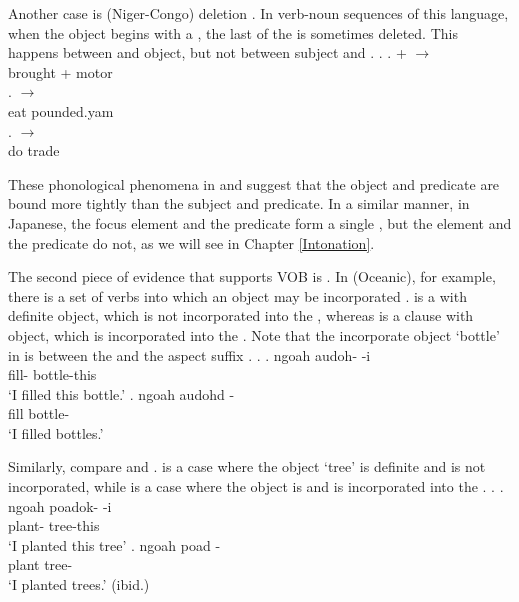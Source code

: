 Another case is  (Niger-Congo)  deletion \cite[from][]{bamgbose64}.
In verb-noun sequences of this language,
when the object begins with a ,
the last  of the  is sometimes deleted.
This happens between  and object, but not between subject and .
%
\ex.
 \ag.  +  $\to$  \\
		brought + motor \\
 \bg.   $\to$  \\
 		eat pounded.yam \\
 \bg.   $\to$  \\
 		do trade \\
		\hfill{\cite[][pp.~29--30]{bamgbose64}}

These phonological phenomena in  and  suggest that
the object and predicate are bound more tightly than the subject and predicate.
In a similar manner,
in Japanese,
the focus element and the predicate form a single ,
but the  element and the predicate do not,
as we will see in Chapter \ref{Intonation}.

The second piece of evidence that supports VOB is .
In  (Oceanic), for example,
there is a set of verbs into which an  object may be incorporated \cite[from][]{harrison76}.
\Next[a] is a  with definite object,
which is not incorporated into the ,
whereas \Next[b] is a clause with  object,
which is incorporated into the .
Note that the incorporate object  `bottle' in \Next[b] is between the  and the aspect suffix .
%
\ex.
 \ag. ngoah audoh- -i \\
		 fill- bottle-this \\
		`I filled this bottle.'
 \bg. ngoah audohd - \\
		 fill bottle- \\
		`I filled bottles.'
		\hfill{\cite[162]{harrison76}}

Similarly,
compare \Next[a] and \Next[b].
\Next[a] is a case where the object  `tree' is definite and is not incorporated,
while \Next[b] is a case where the object is  and is incorporated into the .
\ex.
 \ag. ngoah poadok- -i \\
 	 plant- tree-this \\
	`I planted this tree'
 \bg. ngoah poad - \\
 	 plant tree- \\
	`I planted trees.'
	\hfill{(ibid.)}

